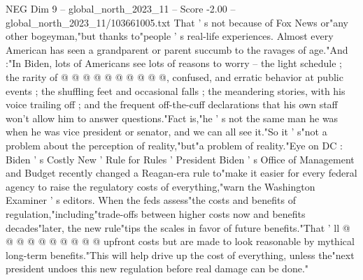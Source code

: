 \begin{textsample}{NEG Dim 9 – global\_north\_2023\_11 – Score -2.00 – global\_north\_2023\_11/103661005.txt}
That ' s not because of Fox News or"any other bogeyman,"but thanks to"people ' s real-life experiences.
Almost every American has seen a grandparent or parent succumb to the ravages of age."And :"In Biden, lots of Americans see lots of reasons to worry -- the light schedule ; the rarity of @ @ @ @ @ @ @ @ @ @, confused, and erratic behavior at public events ; the shuffling feet and occasional falls ; the meandering stories, with his voice trailing off ; and the frequent off-the-cuff declarations that his own staff won't allow him to answer questions."Fact is,"he ' s not the same man he was when he was vice president or senator, and we can all see it."So it ' s"not a problem about the perception of reality,"but"a problem of reality."Eye on DC : Biden ' s Costly New ' Rule for Rules ' President Biden ' s Office of Management and Budget recently changed a Reagan-era rule to"make it easier for every federal agency to raise the regulatory costs of everything,"warn the Washington Examiner ' s editors.
When the feds assess"the costs and benefits of regulation,"including"trade-offs between higher costs now and benefits decades"later, the new rule"tips the scales in favor of future benefits."That ' ll @ @ @ @ @ @ @ @ @ @ upfront costs but are made to look reasonable by mythical long-term benefits."This will help drive up the cost of everything, unless the"next president undoes this new regulation before real damage can be done."

\end{textsample}
